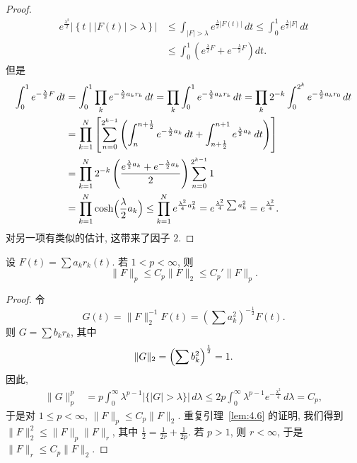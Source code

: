 \begin{proof}
\begin{align*}
e^{\frac{\lambda^{2}}{2}}\left|\left\{t \mid |F(t)|>\lambda\right\}\right|
&\leq\int_{|F|>\lambda}e^{\frac{\lambda}{2}|F(t)|}\,dt
\leq\int_{0}^{1}e^{\frac{\lambda}{2}|F|}\,dt \\
&\leq\int_{0}^{1}\left(e^{\frac{\lambda}{2}F}+e^{-\frac{\lambda}{2}F}\right)dt.
\end{align*}
但是
\begin{align*}
\int_{0}^{1}e^{-\frac{\lambda}{2}F}\,dt
&=\int_{0}^{1}\prod_{k}e^{-\frac{\lambda}{2}a_{k}r_{k}}\,dt
=\prod_{k}\int_{0}^{1}e^{-\frac{\lambda}{2}a_{k}r_{k}}\,dt
=\prod_{k}2^{-k}\int_{0}^{2^{k}}e^{-\frac{\lambda}{2}a_{k}r_{0}}\,dt \\
&=\prod_{k=1}^{N}\left[\sum_{n=0}^{2^{k-1}}\left(\int_{n}^{n+\frac{1}{2}}e^{-\frac{\lambda}{2}a_{k}}\,dt+\int_{n+\frac{1}{2}}^{n+1}e^{\frac{\lambda}{2}a_{k}}\,dt\right)\right] \\
&=\prod_{k=1}^{N}2^{-k}\left(\frac{e^{\frac{\lambda}{2}a_{k}}+e^{-\frac{\lambda}{2}a_{k}}}{2}\right)\sum_{n=0}^{2^{k-1}}1 \\
&=\prod_{k=1}^{N}\cosh\Bigl(\frac{\lambda}{2}a_{k}\Bigr)
\leq\prod_{k=1}^{N}e^{\frac{\lambda^{2}}{4}a_{k}^{2}}
=e^{\frac{\lambda^{2}}{4}\sum a_{k}^{2}}=e^{\frac{\lambda^{2}}{4}}.
\end{align*}
对另一项有类似的估计, 这带来了因子 $2$.
\end{proof}

\begin{corollary}\label{cor:4.11}
设 $F(t)=\sum a_kr_k(t)$. 若 $1<p<\infty$, 则
\[
\|F\|_{p}\leq C_{p}\|F\|_{2}\leq C_{p}'\|F\|_{p}.
\]
\end{corollary}

\begin{proof}
令
\[
G(t)=\|F\|_{2}^{-1}F(t)=\left(\sum a_{k}^{2}\right)^{-\frac{1}{2}}F(t).
\]
则 $G=\sum b_kr_k$, 其中
\[
\|G\|_{2}=\Bigl(\sum b_{k}^{2}\Bigr)^{\frac{1}{2}}=1.
\]
因此,
\begin{align*}
\|G\|_{p}^{p}&=p\int_{0}^{\infty}\lambda^{p-1}|\{|G|>\lambda\}|\,d\lambda
\leq 2p\int_{0}^{\infty}\lambda^{p-1}e^{-\frac{\lambda^{2}}{4}}\,d\lambda=C_{p},
\end{align*}
于是对 $1\leq p<\infty$, $\|F\|_p\leq C_p\|F\|_2$. 重复引理~\ref{lem:4.6} 的证明, 我们得到 $\|F\|_2^2\leq\|F\|_p\|F\|_r$, 其中 $\frac{1}{2}=\frac{1}{2r}+\frac{1}{2p}$. 若 $p>1$, 则 $r<\infty$, 于是 $\|F\|_r\leq C_p\|F\|_2$.
\end{proof}

